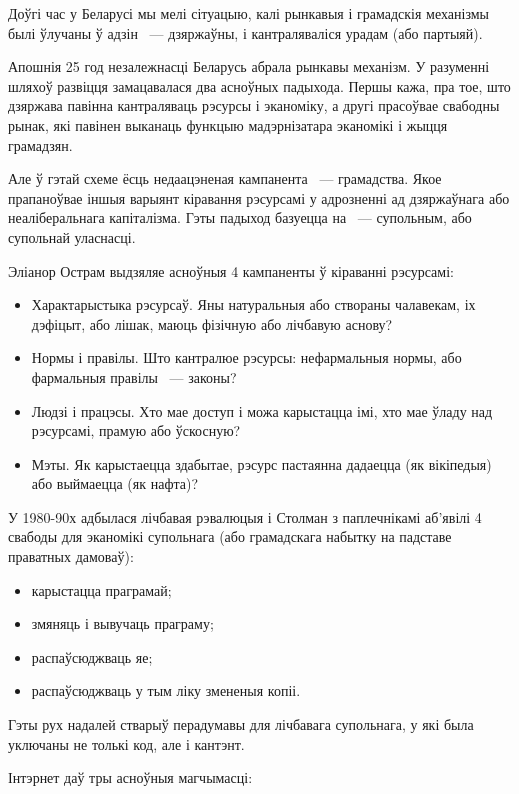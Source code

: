 \documentclass[10pt, a5paper]{article}
\begin{document}
Доўгі час у Беларусі мы мелі сітуацыю, калі рынкавыя і грамадскія механізмы былі ўлучаны ў адзін ~--- дзяржаўны, і кантраляваліся урадам (або партыяй).

Апошнія 25 год незалежнасці Беларусь абрала рынкавы \linebreak механізм. У разуменні шляхоў развіцця замацавалася два асноўных падыхода. Першы кажа, пра тое, што дзяржава павінна кантраляваць рэсурсы і эканоміку, а другі прасоўвае свабодны рынак, які павінен выканаць функцыю мадэрнізатара эканомікі і жыцця грамадзян.

Але ў гэтай схеме ёсць недаацэненая кампанента ~--- грамадства. Якое прапаноўвае іншыя варыянт кіравання рэсурсамі у адрозненні ад дзяржаўнага або неаліберальнага капіталізма. Гэты падыход базуецца на ~--- супольным, або супольнай уласнасці.

Эліанор Острам выдзяляе асноўныя 4 кампаненты ў кіраванні рэсурсамі:

\begin{itemize}
  \item Характарыстыка рэсурсаў. Яны натуральныя або створаны чалавекам, іх дэфіцыт, або лішак, маюць фізічную або лічбавую аснову?
  \item Нормы і правілы. Што кантралюе рэсурсы: нефармальныя нормы, або фармальныя правілы ~--- законы?
  \item Людзі і працэсы. Хто мае доступ і можа карыстацца імі, хто мае ўладу над рэсурсамі, прамую або ўскосную?
  \item Мэты. Як карыстаецца здабытае, рэсурс пастаянна дадаецца (як вікіпедыя) або выймаецца (як нафта)?
\end{itemize}

У 1980-90х адбылася лічбавая рэвалюцыя і Столман з паплечнікамі аб’явілі 4 свабоды для эканомікі супольнага (або грамадскага набытку на падставе праватных дамоваў):

\begin{itemize}
  \item карыстацца праграмай;
  \item змяняць і вывучаць праграму;
  \item распаўсюджваць яе;
  \item распаўсюджваць у тым ліку змененыя копіі.
\end{itemize}

Гэты рух надалей стварыў перадумавы для лічбавага супольнага, у які была уключаны не толькі код, але і кантэнт.

Інтэрнет даў тры асноўныя магчымасці:
\end{document}
